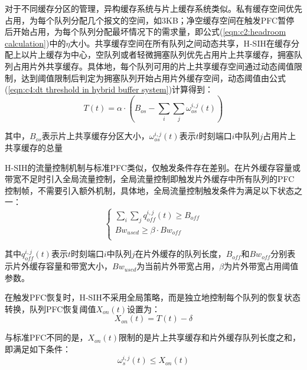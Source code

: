 对于不同缓存分区的管理，异构缓存系统与片上缓存系统类似。私有缓存空间优先占用，为每个队列分配几个报文的空间，如3KB；净空缓存空间在触发PFC暂停后开始占用，为每个队列分配最坏情况下的需求量，即公式(\ref{eqn:c2:headroom calculation})中的$\eta$大小。共享缓存空间在所有队列之间动态共享，H-SIH在缓存分配上以片上缓存为中心，空队列或者轻微拥塞队列优先占用片上共享缓存，拥塞队列占用片外共享缓存。具体地，每个队列可用的片上共享缓存空间通过动态阈值限制，达到阈值限制后判定为拥塞队列开始占用片外缓存空间，动态阈值由公式(\ref{eqn:c4:dt threshold in hybrid buffer system})计算得到：
\begin{equation}
  T(t)=\alpha \cdot (B_{os} - \sum_{i} \sum_{j} \omega_{os}^{i,j}(t))
  \label{eqn:c4:dt threshold in hybrid buffer system}
\end{equation}

\noindent 其中，$B_{os}$表示片上共享缓存分区大小，$\omega_{os}^{i,j}(t)$表示$t$时刻端口$i$中队列$j$占用片上共享缓存的总量

H-SIH的流量控制机制与标准PFC类似，仅触发条件存在差别。在片外缓存容量或带宽不足时引入全局流量控制，全局流量控制即触发片外缓存中所有队列的PFC控制帧，不需要引入额外机制，具体地，全局流量控制触发条件为满足以下状态之一：
\begin{equation}
  \begin{cases}
    \sum_{i} \sum_{j} q^{i,j}_{off}(t) \geqslant B_{off} \\
    Bw_{used} \geqslant \beta \cdot Bw_{off} \\
  \end{cases}
  \label{eqn:c4:global pause invoke condition}
\end{equation}

\noindent 其中$q^{i,j}_{off}(t)$表示$t$时刻端口$i$中队列$j$在片外缓存的队列长度，$B_{off}$和$Bw_{off}$分别表示片外缓存容量和带宽大小，$Bw_{used}$为当前片外带宽占用，$\beta$为片外带宽占用阈值参数。

在触发PFC恢复时，H-SIH不采用全局策略，而是独立地控制每个队列的恢复状态转换，队列PFC恢复阈值$X_{on}(t)$设置为：
\begin{equation}
  X_{on}(t) = T(t) - \delta
  \label{eqn:c4:pfc resume threshold}
\end{equation}

\noindent 与标准PFC不同的是，$X_{on}(t)$限制的是片上共享缓存和片外缓存队列长度之和，即满足如下条件：
\begin{equation}
  \omega_{s}^{i,j}(t) \leqslant X_{on}(t)
  \label{eqn:c4:resume condition}
\end{equation}


